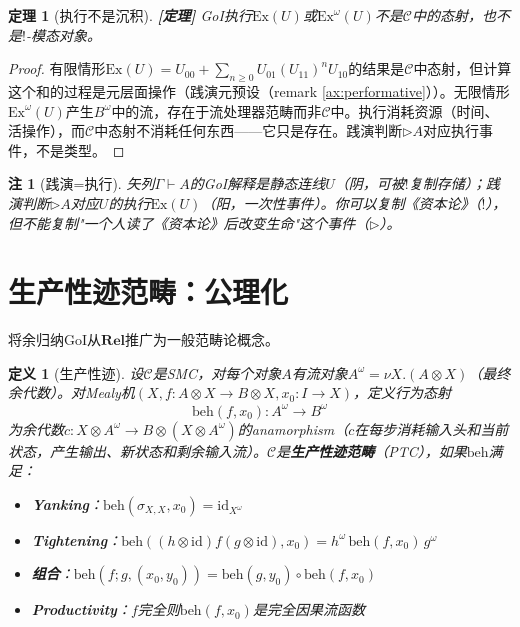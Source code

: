 \documentclass[11pt,a4paper]{article}
\newtheorem{definition}{定义}
\newtheorem{theorem}{定理}
\newtheorem{remark}{注}
\newcommand{\lvl}[1]{\hfill\textbf{\footnotesize[#1]}}
\newcommand{\lvP}{\lvl{定理}}
\newcommand{\bang}{{!}}
\newcommand{\tensor}{\otimes}
\begin{document}
\begin{theorem}[执行不是沉积]\label{thm:execution-not-deposition}\lvP
GoI执行$\mathrm{Ex}(U)$或$\mathrm{Ex}^\omega(U)$不是$\mathcal{C}$中的态射，也不是$\bang$-模态对象。
\end{theorem}

\begin{proof}
有限情形$\mathrm{Ex}(U)=U_{00}+\sum_{n\geq0}U_{01}(U_{11})^nU_{10}$的结果是$\mathcal{C}$中态射，但计算这个和的过程是元层面操作（践演元预设（remark \ref{ax:performative}））。无限情形$\mathrm{Ex}^\omega(U)$产生$B^\omega$中的流，存在于流处理器范畴而非$\mathcal{C}$中。执行消耗资源（时间、活操作），而$\mathcal{C}$中态射不消耗任何东西——它只是存在。践演判断$\triangleright A$对应执行事件，不是类型。
\end{proof}

\begin{remark}[践演=执行]
矢列$\Gamma\vdash A$的GoI解释是静态连线$U$（阴，可被$\bang$复制存储）；践演判断$\triangleright A$对应$U$的执行$\mathrm{Ex}(U)$（阳，一次性事件）。你可以复制《资本论》（$\bang$），但不能复制"一个人读了《资本论》后改变生命"这个事件（$\triangleright$）。
\end{remark}

\section{生产性迹范畴：公理化}

将余归纳GoI从$\mathbf{Rel}$推广为一般范畴论概念。

\begin{definition}[生产性迹]\label{def:ptc}
设$\mathcal{C}$是SMC，对每个对象$A$有流对象$A^\omega=\nu X.(A\tensor X)$（最终余代数）。对Mealy机$(X,f:A\tensor X\to B\tensor X,x_0:I\to X)$，定义行为态射
$$\mathrm{beh}(f,x_0):A^\omega\to B^\omega$$
为余代数$c:X\tensor A^\omega\to B\tensor(X\tensor A^\omega)$的anamorphism（$c$在每步消耗输入头和当前状态，产生输出、新状态和剩余输入流）。$\mathcal{C}$是\textbf{生产性迹范畴}（PTC），如果$\mathrm{beh}$满足：
\begin{itemize}
  \item \textbf{Yanking}：$\mathrm{beh}(\sigma_{X,X},x_0)=\mathrm{id}_{X^\omega}$
  \item \textbf{Tightening}：$\mathrm{beh}((h\tensor\mathrm{id})f(g\tensor\mathrm{id}),x_0)=h^\omega\,\mathrm{beh}(f,x_0)\,g^\omega$
  \item \textbf{组合}：$\mathrm{beh}(f;g,(x_0,y_0))=\mathrm{beh}(g,y_0)\circ\mathrm{beh}(f,x_0)$
  \item \textbf{Productivity}：$f$完全则$\mathrm{beh}(f,x_0)$是完全因果流函数
\end{itemize}
\end{definition}
\end{document}

